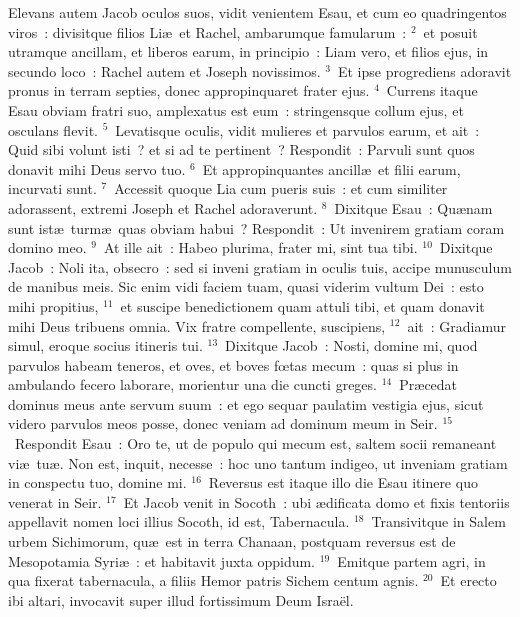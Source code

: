 \lettrine[lines=3,image=true,loversize=0.05,lraise=-0.03]{E}{}levans autem Jacob oculos suos, vidit venientem Esau, et cum eo quadringentos viros~: divisitque filios Li\ae\ et Rachel, ambarumque famularum~:
${}^{2}$~et posuit utramque ancillam, et liberos earum, in principio~: Liam vero, et filios ejus, in secundo loco~: Rachel autem et Joseph novissimos.
${}^{3}$~Et ipse progrediens adoravit pronus in terram septies, donec appropinquaret frater ejus.
${}^{4}$~Currens itaque Esau obviam fratri suo, amplexatus est eum~: stringensque collum ejus, et osculans flevit.
${}^{5}$~Levatisque oculis, vidit mulieres et parvulos earum, et ait~: Quid sibi volunt isti~? et si ad te pertinent~? Respondit~: Parvuli sunt quos donavit mihi Deus servo tuo.
${}^{6}$~Et appropinquantes ancill\ae\ et filii earum, incurvati sunt.
${}^{7}$~Accessit quoque Lia cum pueris suis~: et cum similiter adorassent, extremi Joseph et Rachel adoraverunt.
${}^{8}$~Dixitque Esau~: Qu\ae nam sunt ist\ae\ turm\ae\ quas obviam habui~? Respondit~: Ut invenirem gratiam coram domino meo.
${}^{9}$~At ille ait~: Habeo plurima, frater mi, sint tua tibi.
${}^{10}$~Dixitque Jacob~: Noli ita, obsecro~: sed si inveni gratiam in oculis tuis, accipe munusculum de manibus meis. Sic enim vidi faciem tuam, quasi viderim vultum Dei~: esto mihi propitius,
${}^{11}$~et suscipe benedictionem quam attuli tibi, et quam donavit mihi Deus tribuens omnia. Vix fratre compellente, suscipiens,
${}^{12}$~ait~: Gradiamur simul, eroque socius itineris tui.
${}^{13}$~Dixitque Jacob~: Nosti, domine mi, quod parvulos habeam teneros, et oves, et boves fœtas mecum~: quas si plus in ambulando fecero laborare, morientur una die cuncti greges.
${}^{14}$~Pr\ae cedat dominus meus ante servum suum~: et ego sequar paulatim vestigia ejus, sicut videro parvulos meos posse, donec veniam ad dominum meum in Seir.
${}^{15}$~Respondit Esau~: Oro te, ut de populo qui mecum est, saltem socii remaneant vi\ae\ tu\ae . Non est, inquit, necesse~: hoc uno tantum indigeo, ut inveniam gratiam in conspectu tuo, domine mi.
${}^{16}$~Reversus est itaque illo die Esau itinere quo venerat in Seir.
${}^{17}$~Et Jacob venit in Socoth~: ubi \ae dificata domo et fixis tentoriis appellavit nomen loci illius Socoth, id est, Tabernacula.
${}^{18}$~Transivitque in Salem urbem Sichimorum, qu\ae\ est in terra Chanaan, postquam reversus est de Mesopotamia Syri\ae~: et habitavit juxta oppidum.
${}^{19}$~Emitque partem agri, in qua fixerat tabernacula, a filiis Hemor patris Sichem centum agnis.
${}^{20}$~Et erecto ibi altari, invocavit super illud fortissimum Deum Isra\"el.

